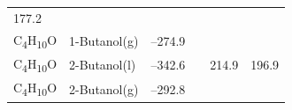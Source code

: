 \documentclass[
  9pt,
]{extbook}
\theoremstyle{definition}
\theoremstyle{definition}
\theoremstyle{definition}
\theoremstyle{remark}
\begin{document}
\begin{longtable}[]{@{}llllll@{}}
\begin{minipage}[t]{0.14\columnwidth}
177.2\strut
\end{minipage}\tabularnewline
\begin{minipage}[t]{0.07\columnwidth}\raggedright
C\textsubscript{4}H\textsubscript{10}O\strut
\end{minipage} & \begin{minipage}[t]{0.17\columnwidth}\raggedright
1-Butanol(g)\strut
\end{minipage} & \begin{minipage}[t]{0.15\columnwidth}\raggedright
--274.9\strut
\end{minipage} & \begin{minipage}[t]{0.15\columnwidth}\raggedright
\strut
\end{minipage} & \begin{minipage}[t]{0.14\columnwidth}\raggedright
\strut
\end{minipage} & \begin{minipage}[t]{0.14\columnwidth}\raggedright
\strut
\end{minipage}\tabularnewline
\begin{minipage}[t]{0.07\columnwidth}\raggedright
C\textsubscript{4}H\textsubscript{10}O\strut
\end{minipage} & \begin{minipage}[t]{0.17\columnwidth}\raggedright
2-Butanol(l)\strut
\end{minipage} & \begin{minipage}[t]{0.15\columnwidth}\raggedright
--342.6\strut
\end{minipage} & \begin{minipage}[t]{0.15\columnwidth}\raggedright
\strut
\end{minipage} & \begin{minipage}[t]{0.14\columnwidth}\raggedright
214.9\strut
\end{minipage} & \begin{minipage}[t]{0.14\columnwidth}\raggedright
196.9\strut
\end{minipage}\tabularnewline
\begin{minipage}[t]{0.07\columnwidth}\raggedright
C\textsubscript{4}H\textsubscript{10}O\strut
\end{minipage} & \begin{minipage}[t]{0.17\columnwidth}\raggedright
2-Butanol(g)\strut
\end{minipage} & \begin{minipage}[t]{0.15\columnwidth}\raggedright
--292.8\strut
\end{minipage} & \begin{minipage}[t]{0.15\columnwidth}\raggedright

\end{minipage}
\end{longtable}
\end{document}
